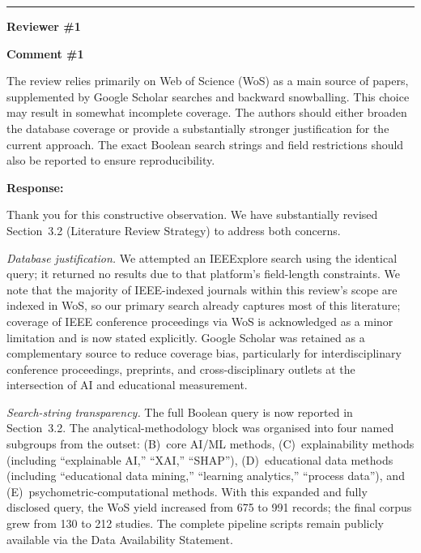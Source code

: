 \documentclass[12pt, a4paper]{article}
\begin{document}
\bigskip\hrule\bigskip


\noindent\textbf{\large Reviewer \#1}

\bigskip

\noindent\textbf{Comment \#1}

\medskip
\noindent\textcolor{reviewerblue}{%
The review relies primarily on Web of Science (WoS) as a main source of papers, supplemented by
Google Scholar searches and backward snowballing. This choice may result in somewhat incomplete
coverage. The authors should either broaden the database coverage or provide a substantially
stronger justification for the current approach. The exact Boolean search strings and field
restrictions should also be reported to ensure reproducibility.}

\medskip
\noindent\textbf{Response:}

Thank you for this constructive observation. We have substantially revised Section~3.2 (Literature
Review Strategy) to address both concerns.

\emph{Database justification.} We attempted an IEEExplore search using the identical query; it
returned no results due to that platform's field-length constraints. We note that the majority of
IEEE-indexed journals within this review's scope are indexed in WoS, so our primary search already
captures most of this literature; coverage of IEEE conference proceedings via WoS is acknowledged
as a minor limitation and is now stated explicitly. Google Scholar was retained as a complementary
source to reduce coverage bias, particularly for interdisciplinary conference proceedings, preprints,
and cross-disciplinary outlets at the intersection of AI and educational measurement.

\emph{Search-string transparency.} The full Boolean query is now reported in Section~3.2. The
analytical-methodology block was organised into four named subgroups from the outset: (B)~core
AI/ML methods, (C)~explainability methods (including ``explainable AI,'' ``XAI,'' ``SHAP''),
(D)~educational data methods (including ``educational data mining,'' ``learning analytics,''
``process data''), and (E)~psychometric-computational methods. With this expanded and fully
disclosed query, the WoS yield increased from 675 to 991 records; the final corpus grew from 130
to 212 studies. The complete pipeline scripts remain publicly available via the Data Availability
Statement.
\end{document}
